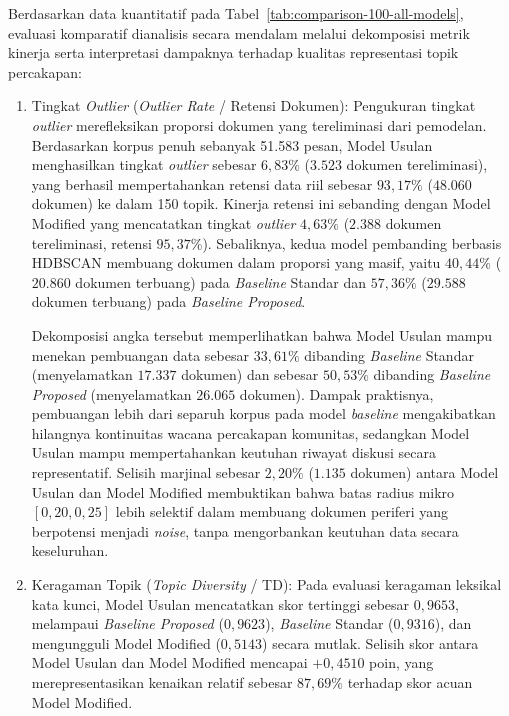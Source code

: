 

Berdasarkan data kuantitatif pada Tabel~\ref{tab:comparison-100-all-models}, evaluasi komparatif dianalisis secara mendalam melalui dekomposisi metrik kinerja serta interpretasi dampaknya terhadap kualitas representasi topik percakapan:

\begin{enumerate}[label=\alph*., leftmargin=*, itemsep=6pt]
    \item Tingkat \textit{Outlier} (\textit{Outlier Rate} / Retensi Dokumen):
    Pengukuran tingkat \textit{outlier} merefleksikan proporsi dokumen yang tereliminasi dari pemodelan. Berdasarkan korpus penuh sebanyak 51.583 pesan, Model Usulan menghasilkan tingkat \textit{outlier} sebesar $6{,}83\%$ ($3.523$ dokumen tereliminasi), yang berhasil mempertahankan retensi data riil sebesar $93{,}17\%$ ($48.060$ dokumen) ke dalam 150 topik. Kinerja retensi ini sebanding dengan Model Modified yang mencatatkan tingkat \textit{outlier} $4{,}63\%$ ($2.388$ dokumen tereliminasi, retensi $95{,}37\%$). Sebaliknya, kedua model pembanding berbasis HDBSCAN membuang dokumen dalam proporsi yang masif, yaitu $40{,}44\%$ ($20.860$ dokumen terbuang) pada \textit{Baseline} Standar dan $57{,}36\%$ ($29.588$ dokumen terbuang) pada \textit{Baseline Proposed}.
    
    Dekomposisi angka tersebut memperlihatkan bahwa Model Usulan mampu menekan pembuangan data sebesar $33{,}61\%$ dibanding \textit{Baseline} Standar (menyelamatkan $17.337$ dokumen) dan sebesar $50{,}53\%$ dibanding \textit{Baseline Proposed} (menyelamatkan $26.065$ dokumen). Dampak praktisnya, pembuangan lebih dari separuh korpus pada model \textit{baseline} mengakibatkan hilangnya kontinuitas wacana percakapan komunitas, sedangkan Model Usulan mampu mempertahankan keutuhan riwayat diskusi secara representatif. Selisih marjinal sebesar $2{,}20\%$ ($1.135$ dokumen) antara Model Usulan dan Model Modified membuktikan bahwa batas radius mikro $[0{,}20, 0{,}25]$ lebih selektif dalam membuang dokumen periferi yang berpotensi menjadi \textit{noise}, tanpa mengorbankan keutuhan data secara keseluruhan.

    \item Keragaman Topik (\textit{Topic Diversity} / TD):
    Pada evaluasi keragaman leksikal kata kunci, Model Usulan mencatatkan skor tertinggi sebesar $0{,}9653$, melampaui \textit{Baseline Proposed} ($0{,}9623$), \textit{Baseline} Standar ($0{,}9316$), dan mengungguli Model Modified ($0{,}5143$) secara mutlak. Selisih skor antara Model Usulan dan Model Modified mencapai $+0{,}4510$ poin, yang merepresentasikan kenaikan relatif sebesar $87{,}69\%$ terhadap skor acuan Model Modified.
    

\end{enumerate}
